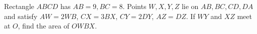 Rectangle $ABCD$ has $AB=9,BC=8$. Points $W,X,Y,Z$ lie on $AB,BC,CD,DA$ and satisfy $AW=2WB$, $CX=3BX$, $CY=2DY$, $AZ=DZ$. If $WY$ and $XZ$ meet at $O$, find the area of $OWBX$.
